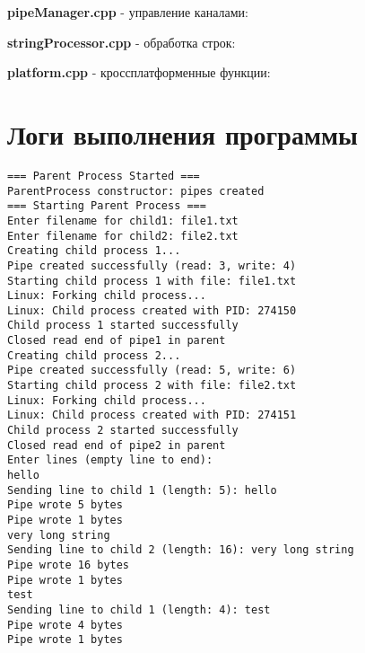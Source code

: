 \textbf{pipeManager.cpp} - управление каналами:


\textbf{stringProcessor.cpp} - обработка строк:


\textbf{platform.cpp} - кроссплатформенные функции:



\section{Логи выполнения программы}

\begin{lstlisting}[caption={Логи выполнения программы}]
=== Parent Process Started ===
ParentProcess constructor: pipes created
=== Starting Parent Process ===
Enter filename for child1: file1.txt
Enter filename for child2: file2.txt
Creating child process 1...
Pipe created successfully (read: 3, write: 4)
Starting child process 1 with file: file1.txt
Linux: Forking child process...
Linux: Child process created with PID: 274150
Child process 1 started successfully
Closed read end of pipe1 in parent
Creating child process 2...
Pipe created successfully (read: 5, write: 6)
Starting child process 2 with file: file2.txt
Linux: Forking child process...
Linux: Child process created with PID: 274151
Child process 2 started successfully
Closed read end of pipe2 in parent
Enter lines (empty line to end):
hello
Sending line to child 1 (length: 5): hello
Pipe wrote 5 bytes
Pipe wrote 1 bytes
very long string
Sending line to child 2 (length: 16): very long string
Pipe wrote 16 bytes
Pipe wrote 1 bytes
test
Sending line to child 1 (length: 4): test
Pipe wrote 4 bytes
Pipe wrote 1 bytes


\end{lstlisting}
